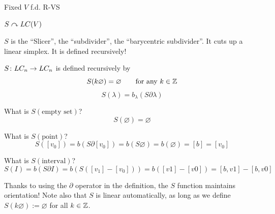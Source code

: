 \documentclass[11pt,leqno,oneside]{amsart}
\numberwithin{thm}{section}
\renewcommand{\null}{\varnothing}
\renewcommand{\d}{\partial}
\begin{document}
Fixed $V$ f.d. R-VS

$S \curvearrowright LC(V)$

$S$ is the ``Slicer'', the ``subdivider'', the ``barycentric subdivider''.  It cuts up a linear simplex.  It is defined recursively!

\begin{defn}
  $S \colon LC_n \to LC_n$ is defined recursively by
  $$S(k\null) = \null \qquad\text{for any $k \in \Z$}$$
  $$S(\lambda) = b_\lambda(S \d \lambda)$$
\end{defn}
\begin{example}
  What is $S(\text{empty set})$?
  $$S(\null) = \null$$
\end{example}
\begin{example}
  What is $S(\text{point})$?
  $$S([v_0]) = b(S \d [v_0]) = b(S \null) = b(\null) = [b] = [v_0]$$
\end{example}
\begin{example}
  What is $S(\text{interval})$?
  $$S(I) = b(S \d I) = b(S ([v_1] - [v_0])) = b([v1] - [v0]) = [b,v1] - [b,v0]$$
\end{example}

Thanks to using the $\d$ operator in the definition, the $S$ function maintains orientation!  Note also that $S$ is linear automatically, as long as we define $S(k\null) := \null$ for all $k \in {\mathbb Z}$.
\end{document}
